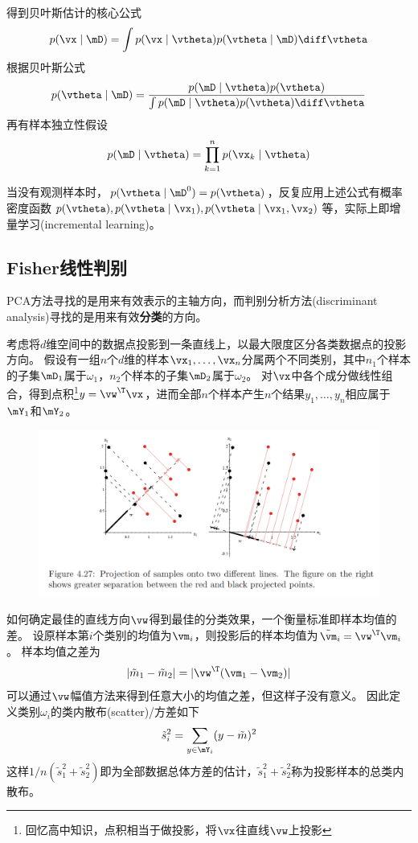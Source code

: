 得到贝叶斯估计的核心公式
\[p(\vx\mid\mD)=\int p(\vx\mid\vtheta)p(\vtheta\mid\mD)\diff\vtheta\]
根据贝叶斯公式
\[p(\vtheta\mid\mD)=\frac{p(\mD\mid\vtheta)p(\vtheta)}{\int p(\mD\mid\vtheta)p(\vtheta)\diff\vtheta}\]
再有样本独立性假设
\[p(\mD\mid\vtheta)=\prod_{k=1}^n p(\vx_k\mid\vtheta)\]

当没有观测样本时，$p(\vtheta\mid\mD^0)=p(\vtheta)$，反复应用上述公式有概率密度函数$p(\vtheta),p(\vtheta\mid\vx_1),p(\vtheta\mid\vx_1,\vx_2)$等，实际上即增量学习(incremental learning)。

\subsection{Fisher线性判别}
PCA方法寻找的是用来有效表示的主轴方向，而判别分析方法(discriminant analysis)寻找的是用来有效\textbf{分类}的方向。

考虑将$d$维空间中的数据点投影到一条直线上，以最大限度区分各类数据点的投影方向。
假设有一组$n$个$d$维的样本$\vx_1,\ldots,\vx_n$分属两个不同类别，其中$n_1$个样本的子集$\mD_1$属于$\omega_1$，$n_2$个样本的子集$\mD_2$属于$\omega_2$。
对$\vx$中各个成分做线性组合，得到点积\footnote{回忆高中知识，点积相当于做投影，将$\vx$往直线$\vw$上投影}$y=\vw^\T\vx$，进而全部$n$个样本产生$n$个结果$y_1,\ldots,y_n$相应属于$\mY_1$和$\mY_2$。
\begin{figure}[H]
\centering
\includegraphics[width=0.9\linewidth]{fig/Fisher.png}
\end{figure}

如何确定最佳的直线方向$\vw$得到最佳的分类效果，一个衡量标准即样本均值的差。
设原样本第$i$个类别的均值为$\vm_i$，则投影后的样本均值为$\tilde{\vm}_i=\vw^\T\vm_i$。
样本均值之差为
\[|\tilde{m}_1-\tilde{m}_2|=|\vw^\T(\vm_1-\vm_2)|\]
可以通过$\vw$幅值方法来得到任意大小的均值之差，但这样子没有意义。
因此定义类别$\omega_i$的类内散布(scatter)/方差如下
\[\tilde{s}_i^2=\sum_{y\in\mY_i}(y-\tilde{m})^2\]
这样$1/n(\tilde{s}_1^2+\tilde{s}_2^2)$即为全部数据总体方差的估计，$\tilde{s}_1^2+\tilde{s}_2^2$称为投影样本的总类内散布。

